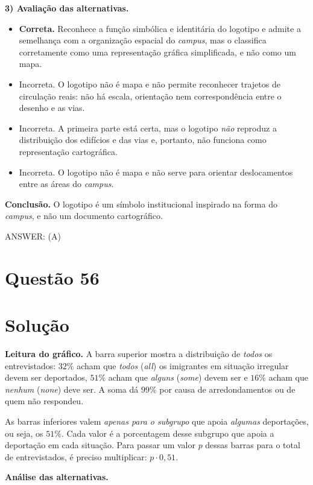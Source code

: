 \documentclass{article}%
\begin{document}
\textbf{3) Avaliação das alternativas.}
\begin{itemize}
  \item[(a)] \textbf{Correta.} Reconhece a função simbólica e identitária do logotipo e admite a semelhança com a organização espacial do \emph{campus}, mas o classifica corretamente como uma representação gráfica simplificada, e não como um mapa.
  \item[(b)] Incorreta. O logotipo não é mapa e não permite reconhecer trajetos de circulação reais: não há escala, orientação nem correspondência entre o desenho e as vias.
  \item[(c)] Incorreta. A primeira parte está certa, mas o logotipo \emph{não} reproduz a distribuição dos edifícios e das vias e, portanto, não funciona como representação cartográfica.
  \item[(d)] Incorreta. O logotipo não é mapa e não serve para orientar deslocamentos entre as áreas do \emph{campus}.
\end{itemize}

\textbf{Conclusão.} O logotipo é um símbolo institucional inspirado na forma do \emph{campus}, e não um documento cartográfico.

ANSWER: (A)%
\newpage%
\section*{Questão 56}

\section*{Solução}

\textbf{Leitura do gráfico.} A barra superior mostra a distribuição de \emph{todos} os entrevistados: $32\%$ acham que \emph{todos} (\emph{all}) os imigrantes em situação irregular devem ser deportados, $51\%$ acham que \emph{alguns} (\emph{some}) devem ser e $16\%$ acham que \emph{nenhum} (\emph{none}) deve ser. A soma dá $99\%$ por causa de arredondamentos ou de quem não respondeu.

As barras inferiores valem \emph{apenas para o subgrupo} que apoia \emph{algumas} deportações, ou seja, os $51\%$. Cada valor é a porcentagem desse subgrupo que apoia a deportação em cada situação. Para passar um valor $p$ dessas barras para o total de entrevistados, é preciso multiplicar: $p \cdot 0{,}51$.

\textbf{Análise das alternativas.}
\end{document}
